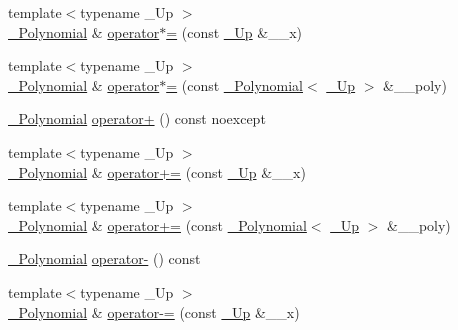 \begin{DoxyCompactItemize}
\item 
{\footnotesize template$<$typename \+\_\+\+Up $>$ }\\\hyperlink{class____gnu__cxx_1_1__Polynomial}{\+\_\+\+Polynomial} \& \hyperlink{class____gnu__cxx_1_1__Polynomial_ad5b3128a53c12abe9147832a1a581f6a}{operator$\ast$=} (const \hyperlink{class____gnu__cxx_1_1__Polynomial_a242114d4b86648a5dff67a8221f80d40}{\+\_\+\+Up} \&\+\_\+\+\_\+x)
\item 
{\footnotesize template$<$typename \+\_\+\+Up $>$ }\\\hyperlink{class____gnu__cxx_1_1__Polynomial}{\+\_\+\+Polynomial} \& \hyperlink{class____gnu__cxx_1_1__Polynomial_ab7daa447472ac775ee38ef0db323bb19}{operator$\ast$=} (const \hyperlink{class____gnu__cxx_1_1__Polynomial}{\+\_\+\+Polynomial}$<$ \hyperlink{class____gnu__cxx_1_1__Polynomial_a242114d4b86648a5dff67a8221f80d40}{\+\_\+\+Up} $>$ \&\+\_\+\+\_\+poly)
\item 
\hyperlink{class____gnu__cxx_1_1__Polynomial}{\+\_\+\+Polynomial} \hyperlink{class____gnu__cxx_1_1__Polynomial_acbaf9cbeb167e41490d976a083f131d8}{operator+} () const noexcept
\item 
{\footnotesize template$<$typename \+\_\+\+Up $>$ }\\\hyperlink{class____gnu__cxx_1_1__Polynomial}{\+\_\+\+Polynomial} \& \hyperlink{class____gnu__cxx_1_1__Polynomial_a68658f4f4692cd8a840919123d03995a}{operator+=} (const \hyperlink{class____gnu__cxx_1_1__Polynomial_a242114d4b86648a5dff67a8221f80d40}{\+\_\+\+Up} \&\+\_\+\+\_\+x)
\item 
{\footnotesize template$<$typename \+\_\+\+Up $>$ }\\\hyperlink{class____gnu__cxx_1_1__Polynomial}{\+\_\+\+Polynomial} \& \hyperlink{class____gnu__cxx_1_1__Polynomial_ac7b0aafe9829a3eae65f79a99881fac2}{operator+=} (const \hyperlink{class____gnu__cxx_1_1__Polynomial}{\+\_\+\+Polynomial}$<$ \hyperlink{class____gnu__cxx_1_1__Polynomial_a242114d4b86648a5dff67a8221f80d40}{\+\_\+\+Up} $>$ \&\+\_\+\+\_\+poly)
\item 
\hyperlink{class____gnu__cxx_1_1__Polynomial}{\+\_\+\+Polynomial} \hyperlink{class____gnu__cxx_1_1__Polynomial_a814ac6ceea7d2b6d42c371b4d631b47f}{operator-\/} () const
\item 
{\footnotesize template$<$typename \+\_\+\+Up $>$ }\\\hyperlink{class____gnu__cxx_1_1__Polynomial}{\+\_\+\+Polynomial} \& \hyperlink{class____gnu__cxx_1_1__Polynomial_a4fa6ae9adb4c4f946839d29b033ededb}{operator-\/=} (const \hyperlink{class____gnu__cxx_1_1__Polynomial_a242114d4b86648a5dff67a8221f80d40}{\+\_\+\+Up} \&\+\_\+\+\_\+x)

\end{DoxyCompactItemize}
